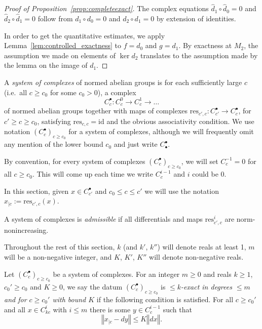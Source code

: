 \begin{proof}[Proof of Proposition~\ref{prop:completeexact}]
  The complex equations $\widehat d_1 ∘ \widehat d_0 = 0$ and
  $\widehat d_2 ∘ \widehat d_1 = 0$ follow from $d_1 ∘ d_0 = 0$ and
  $d_2 ∘ d_1 = 0$ by extension of identities.

  In order to get the quantitative estimates, we apply
  Lemma~\ref{lem:controlled_exactness} to $f = d_0$ and $g = d_1$. By exactness
  at $M_2$, the assumption we made on elements of $\ker d_2$ translates to the
  assumption made by the lemma on the image of $d_1$.
\end{proof}

\begin{definition}
  \label{system_of_complexes}
  \leanok
  A \emph{system of complexes} of normed abelian groups
  is for each sufficiently large $c$ (i.e.~all $c\geq c_0$ for some $c_0>0$),
  a complex
  \[
  C_c^\bullet: C_c^0\to C_c^1\to\ldots
  \]
  of normed abelian groups together with maps of complexes
  $\mathrm{res}_{c',c}: C_{c'}^\bullet\to C_c^\bullet$,
  for $c' ≥ c \geq c_0$,
  satisfying $\mathrm{res}_{c,c}=\mathrm{id}$ and the obvious associativity condition.
  We use notation $(C_c^\bullet)_{c\geq c_0}$ for a system of complexes,
  although we will frequently omit any mention of the lower bound $c_0$
  and just write $C_\bullet^\bullet$.
\end{definition}

By convention, for every system of complexes $(C_c^\bullet)_{c\geq c_0}$,
we will set $C^{-1}_c = 0$ for all $c\geq c_0$.
This will come up each time we write $C^{i-1}_c$ and $i$ could be $0$.

In this section, given $x ∈ C^•_{c'}$ and $c_0\leq c ≤ c'$ we will use the notation
$x_{|c} := \mathrm{res}_{c', c}(x)$.

\begin{definition}
  \label{admissible}
  \leanok
  A system of complexes is \emph{admissible}
  if all differentials and maps $\mathrm{res}_{c',c}^i$ are norm-nonincreasing.
\end{definition}

Throughout the rest of this section, $k$ (and $k'$, $k''$) will denote reals at least 1,
$m$ will be a non-negative integer, and $K$, $K'$, $K''$ will denote non-negative reals.

\begin{definition}
  \label{is_bounded_exact}
  \leanok
  Let $(C_c^\bullet)_{c\geq c_0}$ be a system of complexes.
  For an integer $m\geq 0$ and reals $k \ge 1$, $c_0'\geq c_0$ and $K\geq0$,
  we say the datum $(C_c^\bullet)_{c\geq c_0}$ is
  \emph{$\leq k$-exact in degrees $\leq m$ and for $c\geq c_0'$ with bound $K$} if the following condition is satisfied.
  For all $c\geq c_0'$ and all $x\in C_{kc}^i$ with $i\leq m$
  there is some $y\in C_c^{i-1}$ such that
  \[
    ‖x_{|c} - dy‖ ≤ K ‖dx‖.
  \]
\end{definition}


